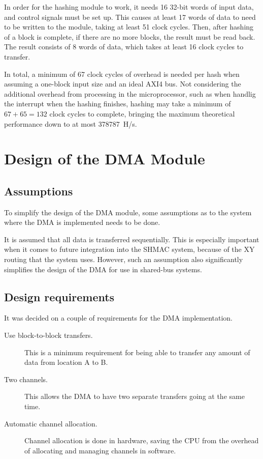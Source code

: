 In order for the hashing module to work, it needs 16 32-bit words of input data,
and control signals must be set up. This causes at least 17 words of data to
need to be written to the module, taking at least 51 clock cycles. Then, after
hashing of a block is complete, if there are no more blocks, the result must
be read back. The result consists of 8 words of data, which takes at least 16
clock cycles to transfer.

In total, a minimum of 67 clock cycles of overhead is needed per hash when assuming
a one-block input size and an ideal AXI4 bus. Not considering the additional overhead
from processing in the microprocessor, such as when handlig the interrupt when the
hashing finishes, hashing may take a minimum of $67 + 65 = 132$ clock cycles to
complete, bringing the maximum theoretical performance down to at most 378787~H/s.

\section{Design of the DMA Module}
\label{sec:dma-architecture}

\subsection{Assumptions}
To simplify the design of the DMA module, some assumptions as to the system where the
DMA is implemented needs to be done.

It is assumed that all data is transferred sequentially. This is especially important when
it comes to future integration into the SHMAC system, because of the XY routing that the
system uses. However, such an assumption also significantly simplifies the design of the
DMA for use in shared-bus systems.

\subsection{Design requirements}

It was decided on a couple of requirements for the DMA implementation.

\begin{description}
	\item[Use block-to-block transfers.] This is a minimum requirement for being
	able to transfer any amount of data from location A to B.
	\item[Two channels.] This allows the DMA to have two separate transfers going
	at the same time.
	\item[Automatic channel allocation.] Channel allocation is done in hardware,
	saving the CPU from the overhead of allocating and managing channels in software.
\end{description}

